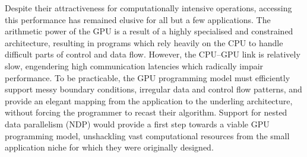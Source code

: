Despite their attractiveness for computationally intensive operations, accessing
this performance has remained elusive for all but a few applications. The
arithmetic power of the GPU is a result of a highly specialised and constrained
architecture, resulting in programs which rely heavily on the CPU to handle
difficult parts of control and data flow. However, the CPU--GPU link is
relatively slow, engendering high communication latencies which radically impair
performance. To be practicable, the GPU programming model must efficiently
support messy boundary conditions, irregular data and control flow patterns, and
provide an elegant mapping from the application to the underling architecture,
without forcing the programmer to recast their algorithm. Support for nested
data parallelism \cite{Blelloch:1994vc,Blelloch:1996jx} (NDP) would provide a
first step towards a viable GPU programming model, unshackling vast
computational resources from the small application niche for which they were
originally designed.

